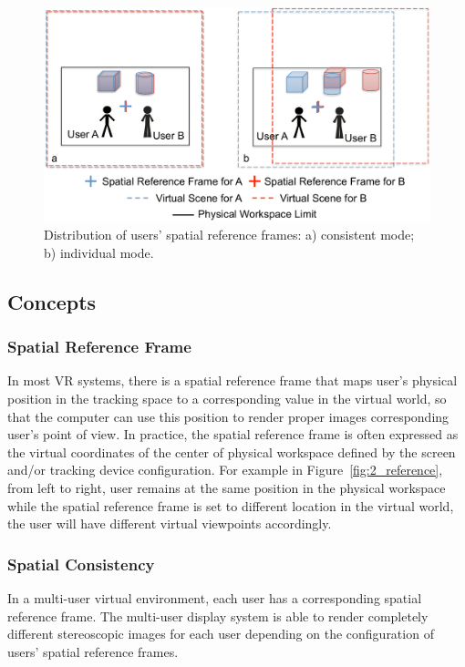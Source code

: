 \begin{figure}[htb]
  \centering
  \includegraphics[width=.9\textwidth]{figures/ch2/consistency}
  \caption{\label{fig:2_consistency}Distribution of users' spatial reference frames: a) consistent mode; b) individual mode.}
\end{figure} 

\subsection{Concepts}
\subsubsection{Spatial Reference Frame}
In most VR systems, there is a spatial reference frame that maps user's physical position in the tracking space to a corresponding value in the virtual world, so that the computer can use this position to render proper images corresponding user's point of view. In practice, the spatial reference frame is often expressed as the virtual coordinates of the center of physical workspace defined by the screen and/or tracking device configuration. For example in Figure~\ref{fig:2_reference}, from left to right, user remains at the same position in the physical workspace while the spatial reference frame is set to different location in the virtual world, the user will have different virtual viewpoints accordingly.


\subsubsection{Spatial Consistency}
In a multi-user virtual environment, each user has a corresponding spatial reference frame. The multi-user display system is able to render completely different stereoscopic images for each user depending on the configuration of users' spatial reference frames.

